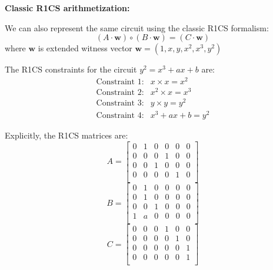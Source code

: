 \documentclass[../lecture-notes-148x210.tex]{subfiles}
\begin{document}
\begin{example}
\textbf{Classic R1CS arithmetization:}

We can also represent the same circuit using the classic R1CS formalism:
\[
(A \cdot \mathbf{w}) \circ (B \cdot \mathbf{w}) = (C \cdot \mathbf{w})
\]
where $\mathbf{w}$ is extended witness vector $\mathbf{w} = (1, x, y, x^2, x^3, y^2)$

The R1CS constraints for the circuit $y^2 = x^3 + a x + b$ are:
\[
\begin{array}{rl}
\text{Constraint 1:} & x \times x = x^2 \\
\text{Constraint 2:} & x^2 \times x = x^3 \\
\text{Constraint 3:} & y \times y = y^2 \\
\text{Constraint 4:} & x^3 + a x + b = y^2
\end{array}
\]

Explicitly, the R1CS matrices are:
\[
A = \begin{bmatrix}
0 & 1 & 0 & 0 & 0 & 0 \\
0 & 0 & 0 & 1 & 0 & 0 \\
0 & 0 & 1 & 0 & 0 & 0 \\
0 & 0 & 0 & 0 & 1 & 0 \\
\end{bmatrix}
\]
\[
B = \begin{bmatrix}
0 & 1 & 0 & 0 & 0 & 0 \\
0 & 1 & 0 & 0 & 0 & 0 \\
0 & 0 & 1 & 0 & 0 & 0 \\
1 & a & 0 & 0 & 0 & 0 \\
\end{bmatrix}
\]
\[
C = \begin{bmatrix}
0 & 0 & 0 & 1 & 0 & 0 \\
0 & 0 & 0 & 0 & 1 & 0 \\
0 & 0 & 0 & 0 & 0 & 1 \\
0 & 0 & 0 & 0 & 0 & 1 \\
\end{bmatrix}
\]
\end{example}
\end{document}
